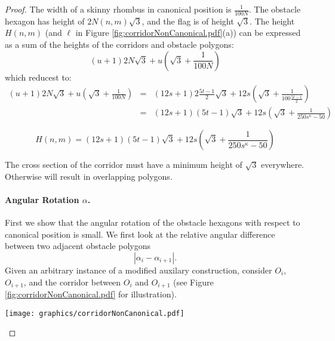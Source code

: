 \documentclass[10pt]{CSUNthesis}
\theoremstyle{plain}%
\theoremstyle{definition}
\theoremstyle{remark}
\newcommand{\lr}[1]{\left( #1 \right)}
\begin{document}
\begin{proof}
The width of a skinny rhombus in canonical position is $\frac{1}{100N}$.
The obstacle hexagon has height of $ 2 N(n,m) \sqrt{3}$, and the flag is of height $\sqrt{3}$. 
The height $H(n,m)$ (and $\ell$ in Figure \ref{fig:corridorNonCanonical.pdf}(a)) can be expressed as a sum of the heights of the corridors and obstacle polygons:
$$(u+1) 2 N \sqrt{3} + u \lr{\sqrt{3}+ \frac{1}{100N}}$$
which reducest to:
\begin{eqnarray*}
(u+1) 2 N  \sqrt{3} + u \lr{\sqrt{3}+ \frac{1}{100N}}&=&(12s+1) 2 \frac{5t-1}{2}  \sqrt{3} + 12s \lr{\sqrt{3}+ \frac{1}{100\frac{5t-1}{2}}}\\
&=&(12s+1)  (5t-1)  \sqrt{3} + 12s \lr{\sqrt{3}+ \frac{1}{250s^\kappa-50}}
\end{eqnarray*}

\begin{equation}\label{eqn:Hnm}
	H(n,m) = (12s+1)  (5t-1)  \sqrt{3} + 12s \lr{\sqrt{3}+ \frac{1}{250s^\kappa-50}}
\end{equation}

The cross section of the corridor must have a minimum height of $\sqrt{3}$ everywhere.
Otherwise will result in overlapping polygons.\paragraph{Angular Rotation $\alpha$.}
First we show that the angular rotation of the obstacle hexagons with respect to canonical position is small.  
We first look at the relative angular difference between two adjacent obstacle polygons
$$\left\vert \alpha_i - \alpha_{i+1} \right\vert.$$
Given an arbitrary instance of a modified auxilary construction, consider $O_i$, $O_{i+1}$, and the corridor between $O_i$ and $O_{i+1}$ (see Figure \ref{fig:corridorNonCanonical.pdf} for illustration).

\begin{minipage}{\linewidth}
\begin{center}
\texttt{[image: graphics/corridorNonCanonical.pdf]}
\label{fig:corridorNonCanonical.pdf}
\end{center}
\end{minipage}


\end{proof}
\end{document}
